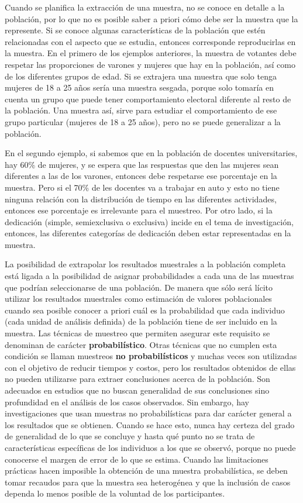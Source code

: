 \documentclass[]{article}
\begin{document}
Cuando se planifica la extracción de una muestra, no se conoce en
detalle a la población, por lo que no es posible saber a priori cómo
debe ser la muestra que la represente. Si se conoce algunas características de la población que estén relacionadas con el aspecto que se estudia, entonces corresponde reproducirlas en la muestra. En el primero de los ejemplos anteriores, la muestra de votantes debe respetar las proporciones de varones y mujeres que hay en la población, así como de los diferentes grupos de edad. Si se extrajera una muestra que solo tenga mujeres de 18 a 25 años sería una muestra sesgada, porque solo tomaría en cuenta un grupo que puede tener comportamiento electoral diferente al resto de la población. Una muestra así, sirve para estudiar el comportamiento de ese grupo particular (mujeres de 18 a 25 años), pero no se puede generalizar a la población.

En el segundo ejemplo, si sabemos que en la población de docentes universitaries, hay 60\% de mujeres, y se espera que las respuestas que den las mujeres sean diferentes a las de los varones, entonces debe respetarse ese porcentaje en la muestra. Pero si el 70\% de les docentes va a trabajar en auto y esto no tiene ninguna relación con la distribución de tiempo en las diferentes actividades, entonces ese porcentaje es irrelevante para el muestreo. Por otro lado, si la dedicación (simple, semiexclusiva o exclusiva) incide en el tema de
investigación, entonces, las diferentes categorías de dedicación deben estar representadas en la muestra.

La posibilidad de extrapolar los resultados muestrales a la población
completa está ligada a la posibilidad de asignar probabilidades a
cada una de las muestras que podrían seleccionarse de una población. De manera que sólo será lícito utilizar los resultados muestrales como
estimación de valores poblacionales cuando sea posible conocer a priori
cuál es la probabilidad que cada individuo (cada unidad de análisis definida) de la población tiene de ser
incluido en la muestra. Las técnicas de muestreo que permiten asegurar
este requisito se denominan de carácter \textbf{probabilístico}. Otras
técnicas que no cumplen esta condición se llaman muestreos \textbf{no probabilísticos} y muchas veces son utilizadas con el objetivo de
reducir tiempos y costos, pero los resultados obtenidos de ellas no
pueden utilizarse para extraer conclusiones acerca de la población. Son
adecuados en estudios que no buscan generalidad de sus conclusiones sino
profundidad en el análisis de los casos observados. Sin embargo, hay
investigaciones que usan muestras no probabilísticas para dar carácter
general a los resultados que se obtienen. Cuando se hace esto, nunca hay
certeza del grado de generalidad de lo que se concluye y hasta qué punto
no se trata de características específicas de los individuos a los que
se observó, porque no puede conocerse el margen de error de lo que se
estima. Cuando las limitaciones prácticas hacen imposible la obtención
de una muestra probabilística, se deben tomar recaudos para que la
muestra sea heterogénea y que la inclusión de casos dependa lo menos
posible de la voluntad de los participantes.
\end{document}
